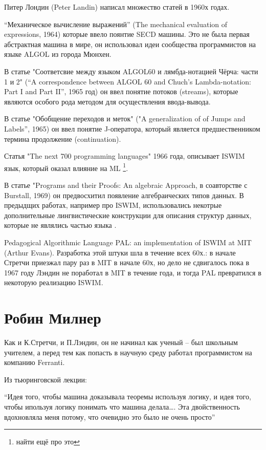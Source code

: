 \documentclass[14pt]{matmex-diploma-custom}
\begin{document}
Питер Лондин (Peter Landin) %
написал множество статей в 1960х годах.

“Механическое вычисление выражений” (The mechanical evaluation of expressions, 1964) которые ввело поянтие SECD машины. Это не была  первая абстрактная машина в мире, он использовал идеи сообщества программистов на языке ALGOL из города Мюнхен. 

В статье "Соответсвие между языком ALGOL60 и лямбда-нотацией Чёрча: части 1 и 2" (“A correspondence between ALGOL 60 and Chuch’s Lambda-notation: Part I and Part II”, 1965 год) он ввел понятие потоков (streams), которые являются особого рода методом для осуществления ввода-вывода.

В статье "Обобщение переходов и меток" ("A generalization of of Jumps and Labels”, 1965) он ввел понятие J-оператора, который является предшественником термина продолжение (continuation).

Статья "The next 700 programming languages" 1966 года, описывает ISWIM язык, который оказал влияние на ML \footnote{найти ещё про это}.

В статье "Programs and their Proofs: An algebraic Approach, в соавторстве с Burstall, 1969) он предвосхитил появление алгебраических типов данных. В предыдщих работах, например про ISWIM, использовались некотрые дополнительные лингвистические конструкции для описания структур данных, которые не являлись частью языка .

Pedagogical Algorithmic Language 
PAL: an implementation of ISWIM at MIT (Arthur Evans). Разработка этой штуки шла  в течение всех 60х.: в начале Стретчи приезжал пару раз в MIT в начале 60х, но дело не сдвигалось пока в 1967 году Лэндин не поработал в MIT в течение года, и тогда PAL превратился в некоторую реализацию ISWIM. 

\chapter{Робин Милнер}

Как и К.Стретчи, и П.Лэндин, он не начинал как ученый -- был школьным учителем, а перед тем как попасть в научную среду работал программистом на компанию Ferranti.
\begin{framed}
Из тьюринговской лекции:

“Идея того, чтобы машина доказывала теоремы используя логику, и идея того, чтобы ипользуя логику понимать что машина делала…. Эта двойственность вдохновляла меня потому, что очевидно это было не очень просто”
\end{framed}
\end{document}

